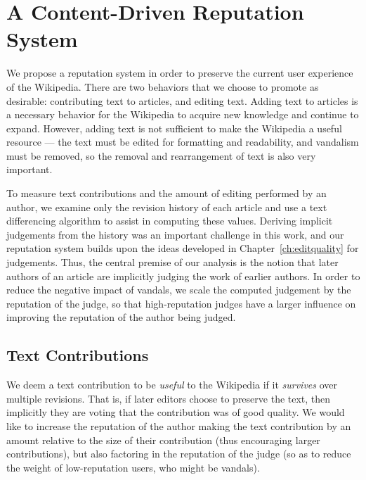 \section{A Content-Driven Reputation System} 


We propose a  reputation system in
order to preserve the current user experience of the Wikipedia.
There are two behaviors that we choose to promote as desirable:
contributing text to articles, and editing text.
Adding text to articles is a necessary behavior for the Wikipedia
to acquire new knowledge and continue to expand.
However, adding text is not sufficient to make the Wikipedia a
useful resource --- the text must be edited for formatting and
readability, and vandalism must be removed, so the removal and
rearrangement of text is also very important.

To measure text contributions and the amount of editing performed
by an author, we examine only the revision history of each article
and use a text differencing algorithm to assist in computing these values.
Deriving implicit judgements from the history was an important
challenge in this work, and our reputation system builds upon
the ideas developed in Chapter~\ref{ch:editquality} for judgements.
Thus, the central premise of our analysis is the notion that later
authors of an article are implicitly judging the work of earlier authors.
In order to reduce the negative impact of vandals, we scale the
computed judgement by the reputation of the judge, so that high-reputation
judges have a larger influence on improving the reputation of the
author being judged.

\subsection{Text Contributions} 

We deem a text contribution to be \textit{useful} to the Wikipedia
if it \textit{survives} over multiple revisions.
That is, if later editors choose to preserve the text, then
implicitly they are voting that the contribution was of good
quality.
We would like to increase the reputation of the author making
the text contribution by an amount relative to the size of their
contribution (thus encouraging larger contributions),
but also factoring in the reputation of the judge (so as to reduce
the weight of low-reputation users, who might be vandals).

